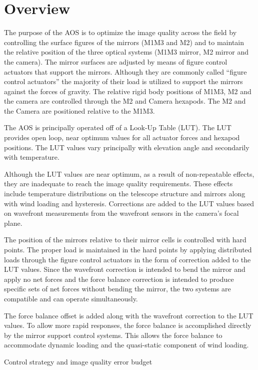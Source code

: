 \section{Overview}

The purpose of the AOS is to optimize the image quality across the field by controlling the surface figures
of the mirrors (M1M3 and M2) and to maintain the relative position of the three optical systems
(M1M3 mirror, M2 mirror and the camera).
The mirror surfaces are adjusted by means of figure control actuators that support the mirrors.
Although they are commonly called ``figure control actuators'' the majority of their load is utilized to
support the mirrors against the forces of gravity. The relative rigid body positions of M1M3, M2 and
the camera are controlled through the M2 and Camera hexapods.
The M2 and the Camera are positioned relative to the M1M3.


The AOS is principally operated off of a Look-Up Table (LUT).
The LUT provides open loop, near optimum values for all actuator forces and hexapod positions.
The LUT values vary principally with elevation angle and secondarily with temperature.

Although the LUT values are near optimum, as a result of non-repeatable effects,
they are inadequate to reach the image quality requirements. These effects include temperature
distributions on the telescope structure and mirrors along with wind loading and hysteresis.
Corrections are added to the LUT values based on wavefront measurements from the wavefront sensors
in the camera's focal plane.

The position of the mirrors relative to their mirror cells is controlled with hard points.
The proper load is maintained in the hard points by applying distributed loads through the figure control
actuators in the form of correction added to the LUT values. Since the wavefront correction
is intended to bend the mirror and apply no net forces and the force balance correction is intended to
produce specific sets of net forces without bending the mirror, the two systems are compatible and
can operate simultaneously.

The force balance offset is added along with the wavefront correction to the LUT values.
To allow more rapid responses, the force balance is accomplished directly by the mirror support control systems.
This allows the force balance to accommodate dynamic loading and the quasi-static component of wind loading.

Control strategy and image quality error budget

